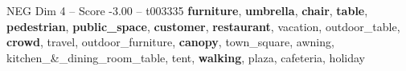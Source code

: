 \begin{textsample}{NEG Dim 4 – Score -3.00 – t003335}  \label{ex:f4_neg_002}
\textbf{furniture}, \textbf{umbrella}, \textbf{chair}, \textbf{table}, \textbf{pedestrian}, \textbf{public\_space}, \textbf{customer}, \textbf{restaurant}, vacation, outdoor\_table, \textbf{crowd}, travel, outdoor\_furniture, \textbf{canopy}, town\_square, awning, kitchen\_\&\_dining\_room\_table, tent, \textbf{walking}, plaza, cafeteria, holiday

\end{textsample}
